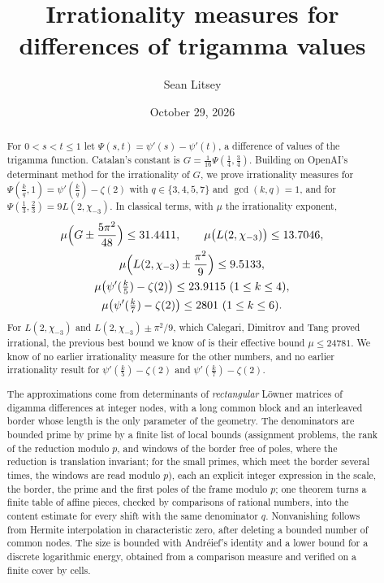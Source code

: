 \documentclass[11pt]{amsart}
\theoremstyle{definition}
\theoremstyle{remark}
\numberwithin{equation}{section}
\newcommand{\MuLamU}{31.4411}
\newcommand{\MuThirdsU}{9.5133}
\newcommand{\MuFifthsU}{23.9115}
\newcommand{\MuSeventhsU}{2801}
\newcommand{\MuChi}{13.7046}
\begin{document}
\title[Irrationality measures for differences of trigamma values]{Irrationality measures for differences of trigamma values}

\author{Sean Litsey}

\date{October 29, 2026}



\begin{abstract}
For $0<s<t\le1$ let $\Psi(s,t)=\psi'(s)-\psi'(t)$, a difference of values of the trigamma function.
Catalan's constant is $G=\frac1{16}\Psi(\frac14,\frac34)$. Building on OpenAI's determinant method for
the irrationality of $G$, we prove irrationality measures for $\Psi(\frac kq,1)=\psi'(\frac kq)-\zeta(2)$
with $q\in\{3,4,5,7\}$ and $\gcd(k,q)=1$, and for $\Psi(\frac13,\frac23)=9L(2,\chi_{-3})$. In classical
terms, with $\mu$ the irrationality exponent,
\[
\begin{gathered}
 \mu\Bigl(G\pm\frac{5\pi^2}{48}\Bigr)\le \MuLamU,\qquad
 \mu\bigl(L(2,\chi_{-3})\bigr)\le \MuChi,\\
 \mu\Bigl(L(2,\chi_{-3})\pm\frac{\pi^2}9\Bigr)\le \MuThirdsU,\\
 \mu\bigl(\psi'(\tfrac k5)-\zeta(2)\bigr)\le\MuFifthsU\ (1\le k\le4),\\
 \mu\bigl(\psi'(\tfrac k7)-\zeta(2)\bigr)\le\MuSeventhsU\ (1\le k\le6).
\end{gathered}
\]
For $L(2,\chi_{-3})$ and $L(2,\chi_{-3})\pm\pi^2/9$, which Calegari, Dimitrov and Tang proved
irrational, the previous best bound we know of is their effective bound $\mu\le24781$. We know of no
earlier irrationality measure for the other numbers, and no earlier irrationality result for
$\psi'(\frac k5)-\zeta(2)$ and $\psi'(\frac k7)-\zeta(2)$.

The approximations come from determinants of \emph{rectangular} L\"owner matrices of digamma differences at integer
nodes, with a long common block and an interleaved border whose length is the only parameter of the geometry. The
denominators are bounded prime by prime by a finite list of local bounds (assignment problems, the rank of the
reduction modulo $p$, and windows of the border free of poles, where the reduction is translation invariant; for the
small primes, which meet the border several times, the windows are read modulo $p$), each an explicit integer expression in the
scale, the border, the prime and the first poles of the frame modulo $p$; one theorem turns a finite table of affine
pieces, checked by comparisons of rational numbers, into the content estimate for every shift with the same
denominator $q$. Nonvanishing follows from Hermite interpolation in characteristic zero, after deleting a bounded number
of common nodes. The size is bounded with Andr\'eief's identity and a lower bound for a discrete logarithmic energy,
obtained from a comparison measure and verified on a finite cover by cells.


\end{abstract}
\end{document}
